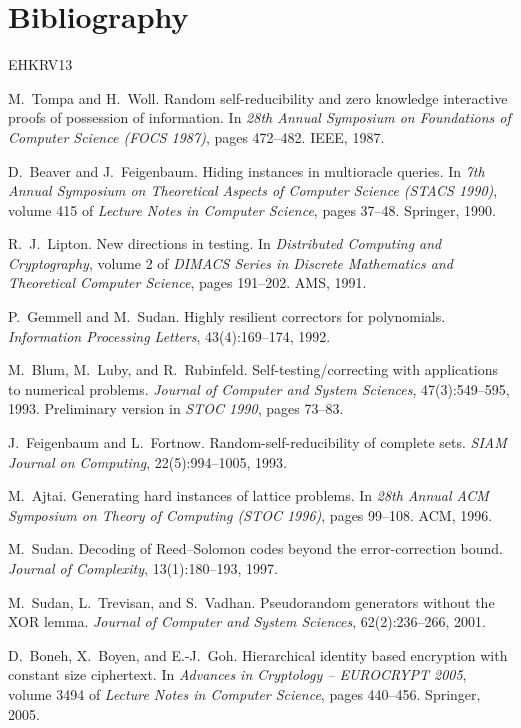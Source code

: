 \documentclass{aicr-solution}
\begin{document}
\section{Bibliography}

\begin{aicrbibliography}{EHKRV13}

M.~Tompa and H.~Woll.
Random self-reducibility and zero knowledge interactive proofs of possession of
information.
In \emph{28th Annual Symposium on Foundations of Computer Science (FOCS 1987)},
pages 472--482. IEEE, 1987.

D.~Beaver and J.~Feigenbaum.
Hiding instances in multioracle queries.
In \emph{7th Annual Symposium on Theoretical Aspects of Computer Science (STACS 1990)},
volume 415 of \emph{Lecture Notes in Computer Science}, pages 37--48. Springer, 1990.

R.~J.~Lipton.
New directions in testing.
In \emph{Distributed Computing and Cryptography}, volume 2 of \emph{DIMACS Series in
Discrete Mathematics and Theoretical Computer Science}, pages 191--202. AMS, 1991.

P.~Gemmell and M.~Sudan.
Highly resilient correctors for polynomials.
\emph{Information Processing Letters}, 43(4):169--174, 1992.

M.~Blum, M.~Luby, and R.~Rubinfeld.
Self-testing/correcting with applications to numerical problems.
\emph{Journal of Computer and System Sciences}, 47(3):549--595, 1993.
Preliminary version in \emph{STOC 1990}, pages 73--83.

J.~Feigenbaum and L.~Fortnow.
Random-self-reducibility of complete sets.
\emph{SIAM Journal on Computing}, 22(5):994--1005, 1993.

M.~Ajtai.
Generating hard instances of lattice problems.
In \emph{28th Annual ACM Symposium on Theory of Computing (STOC 1996)}, pages 99--108.
ACM, 1996.

M.~Sudan.
Decoding of Reed--Solomon codes beyond the error-correction bound.
\emph{Journal of Complexity}, 13(1):180--193, 1997.

M.~Sudan, L.~Trevisan, and S.~Vadhan.
Pseudorandom generators without the XOR lemma.
\emph{Journal of Computer and System Sciences}, 62(2):236--266, 2001.

D.~Boneh, X.~Boyen, and E.-J.~Goh.
Hierarchical identity based encryption with constant size ciphertext.
In \emph{Advances in Cryptology -- EUROCRYPT 2005},
volume 3494 of \emph{Lecture Notes in Computer Science}, pages 440--456. Springer, 2005.


\end{aicrbibliography}
\end{document}
